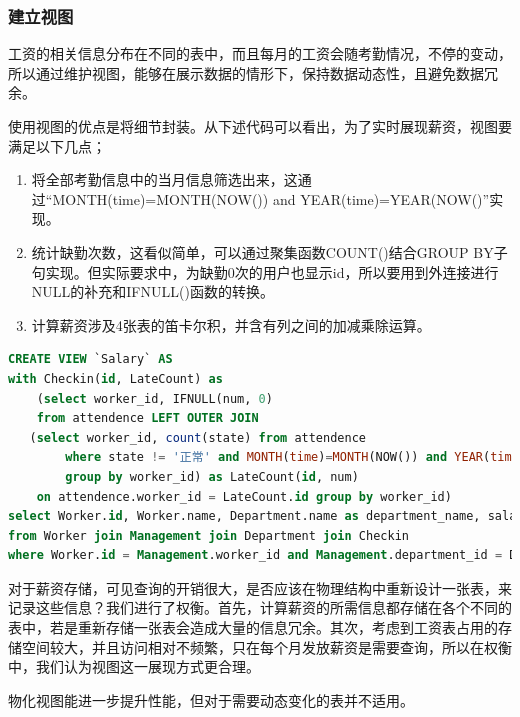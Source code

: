 \documentclass[withoutpreface,bwprint]{cumcmthesis} %
\begin{document}
\subsubsection{建立视图}
工资的相关信息分布在不同的表中，而且每月的工资会随考勤情况，不停的变动，所以通过维护视图，能够在展示数据的情形下，保持数据动态性，且避免数据冗余。\par
使用视图的优点是将细节封装。从下述代码可以看出，为了实时展现薪资，视图要满足以下几点；
\begin{enumerate}
	\item 将全部考勤信息中的当月信息筛选出来，这通过“MONTH(time)=MONTH(NOW()) and YEAR(time)=YEAR(NOW()”实现。
	\item 统计缺勤次数，这看似简单，可以通过聚集函数COUNT()结合GROUP BY子句实现。但实际要求中，为缺勤0次的用户也显示id，所以要用到外连接进行NULL的补充和IFNULL()函数的转换。
	\item 计算薪资涉及4张表的笛卡尔积，并含有列之间的加减乘除运算。
\end{enumerate}
\begin{lstlisting}[language=SQL]
CREATE VIEW `Salary` AS 
with Checkin(id, LateCount) as 
	(select worker_id, IFNULL(num, 0) 
    from attendence LEFT OUTER JOIN 
   (select worker_id, count(state) from attendence 
		where state != '正常' and MONTH(time)=MONTH(NOW()) and YEAR(time)=YEAR(NOW())
		group by worker_id) as LateCount(id, num) 
    on attendence.worker_id = LateCount.id group by worker_id)
select Worker.id, Worker.name, Department.name as department_name, salary, base_salary, -100*Checkin.LateCount as LatePunish, salary+base_salary-100*Checkin.LateCount as total_salary 
from Worker join Management join Department join Checkin 
where Worker.id = Management.worker_id and Management.department_id = Department.id and Worker.id = Checkin.id;
\end{lstlisting}
对于薪资存储，可见查询的开销很大，是否应该在物理结构中重新设计一张表，来记录这些信息？我们进行了权衡。首先，计算薪资的所需信息都存储在各个不同的表中，若是重新存储一张表会造成大量的信息冗余。其次，考虑到工资表占用的存储空间较大，并且访问相对不频繁，只在每个月发放薪资是需要查询，所以在权衡中，我们认为视图这一展现方式更合理。
\par 物化视图能进一步提升性能，但对于需要动态变化的表并不适用。
\end{document}
